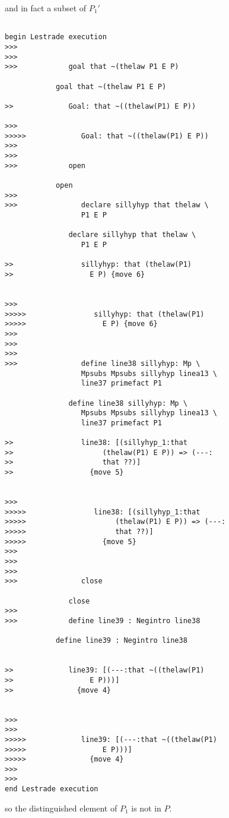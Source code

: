\documentclass[12pt]{article}
\begin{document}
and in fact a subset of $P_1'$

\begin{verbatim}

begin Lestrade execution
>>>
>>>
>>>            goal that ~(thelaw P1 E P)

            goal that ~(thelaw P1 E P)

>>             Goal: that ~((thelaw(P1) E P))

>>>
>>>>>             Goal: that ~((thelaw(P1) E P))
>>>
>>>
>>>            open

            open
>>>
>>>               declare sillyhyp that thelaw \
                  P1 E P

               declare sillyhyp that thelaw \
                  P1 E P

>>                sillyhyp: that (thelaw(P1)
>>                  E P) {move 6}


>>>
>>>>>                sillyhyp: that (thelaw(P1)
>>>>>                  E P) {move 6}
>>>
>>>
>>>
>>>               define line38 sillyhyp: Mp \
                  Mpsubs Mpsubs sillyhyp linea13 \
                  line37 primefact P1

               define line38 sillyhyp: Mp \
                  Mpsubs Mpsubs sillyhyp linea13 \
                  line37 primefact P1

>>                line38: [(sillyhyp_1:that
>>                     (thelaw(P1) E P)) => (---:
>>                     that ??)]
>>                  {move 5}


>>>
>>>>>                line38: [(sillyhyp_1:that
>>>>>                     (thelaw(P1) E P)) => (---:
>>>>>                     that ??)]
>>>>>                  {move 5}
>>>
>>>
>>>
>>>               close

               close
>>>
>>>            define line39 : Negintro line38

            define line39 : Negintro line38


>>             line39: [(---:that ~((thelaw(P1)
>>                  E P)))]
>>               {move 4}


>>>
>>>
>>>>>             line39: [(---:that ~((thelaw(P1)
>>>>>                  E P)))]
>>>>>               {move 4}
>>>
>>>
end Lestrade execution
\end{verbatim}

so the distinguished element of $P_1$ is not in $P$.
\end{document}
